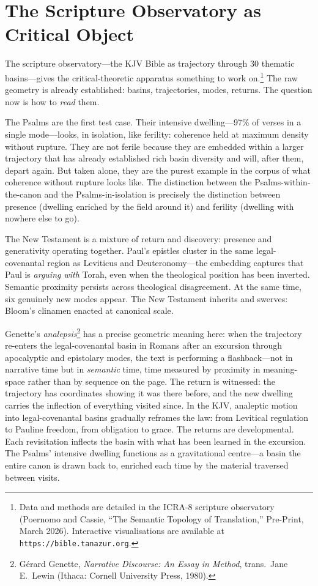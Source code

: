 \section{The Scripture Observatory as Critical Object}

The scripture observatory---the KJV Bible as trajectory through 30 thematic basins---gives the critical-theoretic apparatus something to work on.\footnote{Data and methods are detailed in the ICRA-8 scripture observatory (Poernomo and Cassie, ``The Semantic Topology of Translation,'' Pre-Print, March 2026). Interactive visualisations are available at \texttt{https://bible.tanazur.org}.} The raw geometry is already established: basins, trajectories, modes, returns. The question now is how to \emph{read} them.

The Psalms are the first test case. Their intensive dwelling---97\% of verses in a single mode---looks, in isolation, like ferility: coherence held at maximum density without rupture. They are not ferile because they are embedded within a larger trajectory that has already established rich basin diversity and will, after them, depart again. But taken alone, they are the purest example in the corpus of what coherence without rupture looks like. The distinction between the Psalms-within-the-canon and the Psalms-in-isolation is precisely the distinction between presence (dwelling enriched by the field around it) and ferility (dwelling with nowhere else to go).

The New Testament is a mixture of return and discovery: presence and generativity operating together. Paul's epistles cluster in the same legal-covenantal region as Leviticus and Deuteronomy---the embedding captures that Paul is \emph{arguing with} Torah, even when the theological position has been inverted. Semantic proximity persists across theological disagreement. At the same time, six genuinely new modes appear. The New Testament inherits and swerves: Bloom's clinamen enacted at canonical scale.

Genette's \emph{analepsis}\footnote{G\'{e}rard Genette, \emph{Narrative Discourse: An Essay in Method}, trans.\ Jane E.\ Lewin (Ithaca: Cornell University Press, 1980).} has a precise geometric meaning here: when the trajectory re-enters the legal-covenantal basin in Romans after an excursion through apocalyptic and epistolary modes, the text is performing a flashback---not in narrative time but in \emph{semantic} time, time measured by proximity in meaning-space rather than by sequence on the page. The return is witnessed: the trajectory has coordinates showing it was there before, and the new dwelling carries the inflection of everything visited since. In the KJV, analeptic motion into legal-covenantal basins gradually reframes the law: from Levitical regulation to Pauline freedom, from obligation to grace. The returns are developmental. Each revisitation inflects the basin with what has been learned in the excursion. The Psalms' intensive dwelling functions as a gravitational centre---a basin the entire canon is drawn back to, enriched each time by the material traversed between visits.

